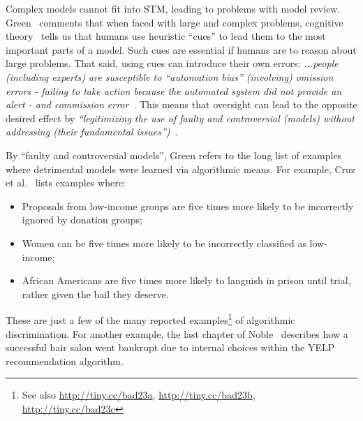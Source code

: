 \documentclass[sigconf,screen]{acmart}
\begin{document}
Complex models cannot fit into STM, leading   to problems with model review.
Green~\cite{green2022flaws}  comments that when faced with large and complex problems,
  cognitive theory~\cite{simon1956rational} tells us that humans use heuristic ``cues'' to lead them to the most important parts
of a model.   Such cues are essential if humans are to reason about large problems.   That said,  using cues can introduce their own errors:
   {\em 
   ...people (including experts) are susceptible to ``automation bias'' (involving) omission errors - failing to take action because the automated system did not provide an alert - and commission error}~\cite{green2022flaws}.
 This means that oversight can lead to the opposite desired effect by {\em ``legitimizing the use of faulty and controversial (models) without addressing (their fundamental issues'')}~\cite{green2022flaws}. 

By ``faulty and controversial models'', Green refers to
the  long list of examples where detrimental models  were learned via
algorithmic means.
For example,   Cruz et al.~\cite{cruz2021promoting}  lists examples where:
\begin{itemize}
\item Proposals from low-income groups are five times more  likely     to be incorrectly ignored by donation groups;
\item Women can be five times more likely to be incorrectly classified as low-income;
\item African Americans are five times more likely to  languish in prison until trial,
rather given the bail they deserve.  
\end{itemize}
These are just a few of the many reported examples\cite{rudin2019explaining}\footnote{See also 
\url{http://tiny.cc/bad23a}, \url{http://tiny.cc/bad23b}, \url{http://tiny.cc/bad23c}} of algorithmic discrimination.
For another example, the last chapter of Noble~\cite{noble2018algorithms} describes how a successful
hair salon went bankrupt due to internal
choices within the YELP recommendation algorithm.
\end{document}
